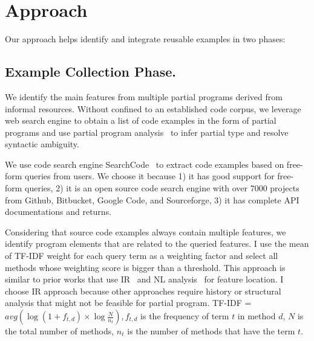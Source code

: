 


\section{Approach}

Our approach helps identify and integrate reusable examples in two phases:

\subsection{Example Collection Phase.}  
We identify the main features from multiple partial programs derived from informal resources. Without confined to an established code corpus, we leverage web search engine to obtain a list of code examples in the form of partial programs and use partial program analysis~\cite{partialProgram:OOPSLA08} to infer partial type and resolve syntactic ambiguity. 

  We use code search engine SearchCode~\cite{SearchCode} to extract code examples based on free-form queries from users.  We choose it because 1) it has good support for free-form queries,  2) it is an open source code search engine with over 7000 projects from  Github, Bitbucket, Google Code, and Sourceforge, 3) it has complete API documentations and returns. 

  Considering that source code examples always contain multiple features, we identify program elements that are related to the queried features. I use the mean of TF-IDF weight  for each query term as a weighting factor and select all methods whose weighting score is bigger than a threshold.  This approach is similar to prior works that use  IR~\cite{Denys:FCA12} and NL analysis~\cite{Hill:FindConcept07} for feature location. I choose IR approach because other approaches require history or structural analysis that might not be feasible for partial program. TF-IDF =  $avg( \log (1 + f_{t,d}) \times  \log \frac {N} {n_t}), f_{t,d}$ is the frequency of term $t$ in method $d$, $N$ is the total number of methods, $n_t$ is the number of methods that have the term $t$. 

